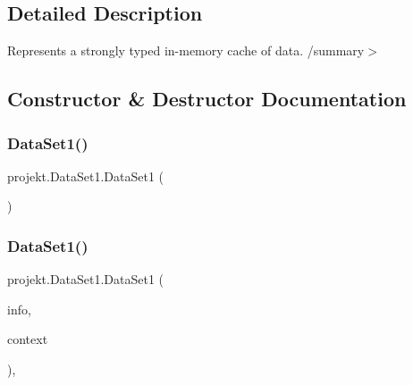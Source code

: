 \subsection{Detailed Description}
Represents a strongly typed in-\/memory cache of data. /summary$>$ 

\subsection{Constructor \& Destructor Documentation}
\mbox{\label{classprojekt_1_1_data_set1_ac0a73e3256e3bf1ec8de8dc45615b4b4}} 
\subsubsection{\texorpdfstring{Data\+Set1()}{DataSet1()}\hspace{0.1cm}{\footnotesize\ttfamily [1/2]}}
{\footnotesize\ttfamily projekt.\+Data\+Set1.\+Data\+Set1 (\begin{DoxyParamCaption}{ }\end{DoxyParamCaption})\hspace{0.3cm}{\ttfamily [inline]}}

\mbox{\label{classprojekt_1_1_data_set1_a276b4a5f57cb8de1a39b36dedefe7613}} 
\subsubsection{\texorpdfstring{Data\+Set1()}{DataSet1()}\hspace{0.1cm}{\footnotesize\ttfamily [2/2]}}
{\footnotesize\ttfamily projekt.\+Data\+Set1.\+Data\+Set1 (\begin{DoxyParamCaption}\item[{global\+::\+System.\+Runtime.\+Serialization.\+Serialization\+Info}]{info,  }\item[{global\+::\+System.\+Runtime.\+Serialization.\+Streaming\+Context}]{context }\end{DoxyParamCaption})\hspace{0.3cm}{\ttfamily [inline]}, {\ttfamily [protected]}}



